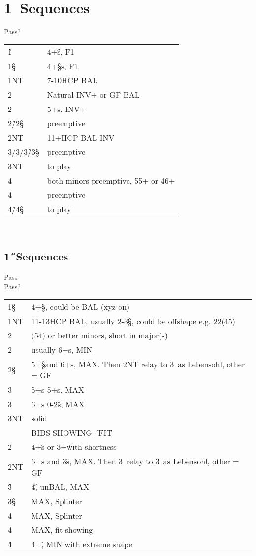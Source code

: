 \newpage

\chapter{1\D\ Sequences}

\hypertarget{1d}{}
\begin{bidding}
\>\D\>Pass\>?
\end{bidding}

\begin{xtabular}{ll}
1\H & 4+\H s, F1 \\
1\S & 4+\S s, F1 \\
1NT &7-10HCP BAL \\
2\C & Natural INV+ or GF BAL \\
2\D &5+\D s, INV+ \\
2\H/2\S & preemptive \\
2NT & 11+HCP BAL INV\\
3\C/3\D/3\H/3\S &preemptive\\
3NT & to play \\
4\C & both minors preemptive, 55+ or 46+\\
4\D &preemptive\\
4\H/4\S &to play\\
\end{xtabular}\\

\section{1\H\ Sequences}

\begin{bidding}
\>\D\>Pass\H\\
\>Pass\>?\\
\end{bidding}

\begin{xtabular}{ll}
1\S & 4+\S, could be BAL (xyz on)\\
1NT & 11-13HCP BAL, usually 2-3\S, could be offshape e.g. 22(45) \\
2\C & (54) or better minors, short in major(s) \\
2\D & usually 6+\D s, MIN \\
2\S & 5+\S and 6+\D s, MAX. Then 2NT relay to 3\C\ as Lebensohl, other = GF \\
3\C & 5+\D s 5+\C s, MAX \\
3\D & 6+\D s 0-2\H s, MAX \\
3NT & solid \D \\
\hline 
       & BIDS SHOWING \H\ FIT \\
2\H & 4+\H s or 3+\H with shortness \\
2NT & 6+\D s and 3\H s, MAX. Then 3\C\ relay to 3\D\ as Lebensohl, other = GF  \\
3\H & 4\H, unBAL, MAX \\
3\S & MAX, Splinter \\
4\C & MAX, Splinter \\
4\D & MAX, fit-showing \\
4\H & 4+\H, MIN with extreme shape \\
\end{xtabular}\\

